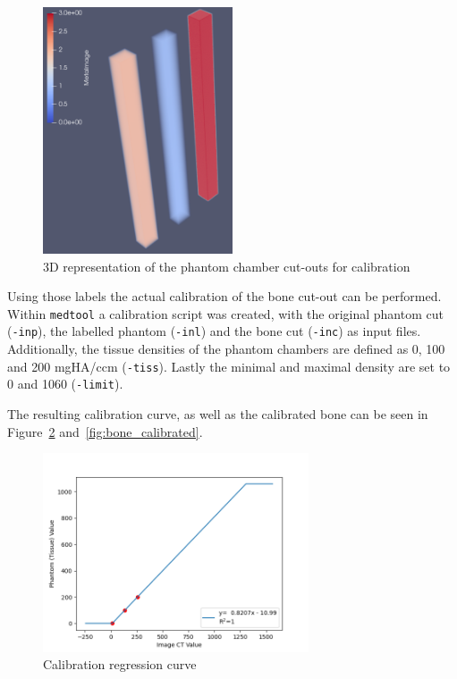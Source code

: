 \documentclass[a4paper,12pt]{article}
\begin{document}
    \begin{figure}[htbp]
        \centering
        \includegraphics[width=0.5\textwidth]{exa_lables_3d}
        \caption{3D representation of the phantom chamber cut-outs for calibration}
        \label{fig:exa_lables_3d}
    \end{figure}

    Using those labels the actual calibration of the bone cut-out can be performed.
    Within \texttt{medtool} a calibration script was created, with the original phantom cut (\texttt{-inp}), the labelled phantom (\texttt{-inl}) and the bone cut (\texttt{-inc}) as input files.
    Additionally, the tissue densities of the phantom chambers are defined as 0, 100 and 200 mgHA/ccm (\texttt{-tiss}).
    Lastly the minimal and maximal density are set to 0 and 1060 (\texttt{-limit}).

    \vspace{10pt}
    The resulting calibration curve, as well as the calibrated bone can be seen in Figure~\ref{fig:calibration_curve} and~\ref{fig:bone_calibrated}.

    \begin{figure}[htbp]
        \centering
        \includegraphics[width=0.7\textwidth]{calibration_curve}
        \caption{Calibration regression curve}
        \label{fig:calibration_curve}
    \end{figure}
\end{document}
